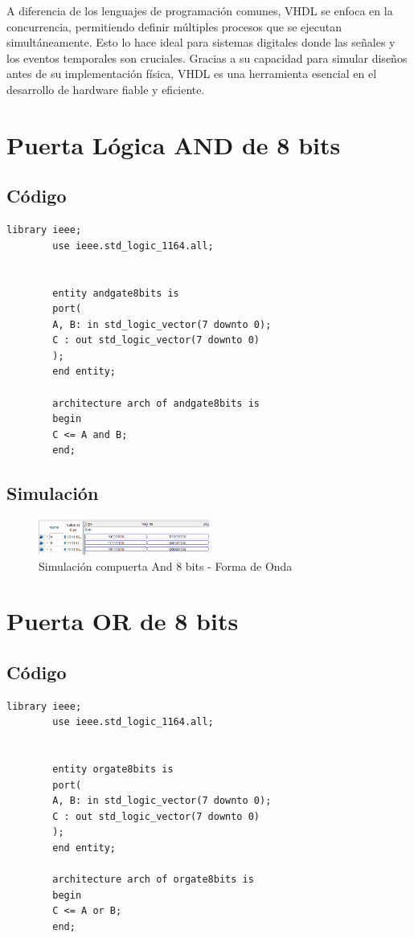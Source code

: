 \documentclass[conference]{IEEEtran}
\begin{document}
	A diferencia de los lenguajes de programación comunes, VHDL se enfoca en la concurrencia, permitiendo definir múltiples procesos que se ejecutan simultáneamente. Esto lo hace ideal para sistemas digitales donde las señales y los eventos temporales son cruciales. Gracias a su capacidad para simular diseños antes de su implementación física, VHDL es una herramienta esencial en el desarrollo de hardware fiable y eficiente.
	
	\section{Puerta Lógica AND de 8 bits}
	\subsection{Código}
	
	\begin{lstlisting}[numbers=none]
		 library ieee;
		use ieee.std_logic_1164.all;
		
		
		entity andgate8bits is
		port(
		A, B: in std_logic_vector(7 downto 0);
		C : out std_logic_vector(7 downto 0)
		);
		end entity;
		
		architecture arch of andgate8bits is
		begin
		C <= A and B;
		end;
	\end{lstlisting}
	
	\subsection{Simulación}
	\begin{figure}[h]
		\centering
		\includegraphics[width=0.5\textwidth]{media/andgate8bits}
		\caption{Simulación compuerta And 8 bits - Forma de Onda}
		\label{fig:andgate8bits}
	\end{figure}
	
	\section{Puerta OR de 8 bits}
	\subsection{Código}
	\begin{lstlisting}[numbers=none]
		 library ieee;
		use ieee.std_logic_1164.all;
		
		
		entity orgate8bits is
		port(
		A, B: in std_logic_vector(7 downto 0);
		C : out std_logic_vector(7 downto 0)
		);
		end entity;
		
		architecture arch of orgate8bits is
		begin
		C <= A or B;
		end;
	\end{lstlisting}
\end{document}
